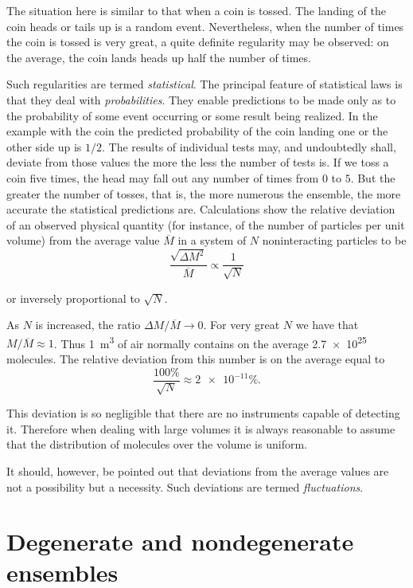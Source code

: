 The situation here is similar to that when a coin is tossed. The landing of the coin heads or tails up is a random event. Nevertheless, when the number of times the coin is tossed is very great, a quite definite regularity may be observed: on the average, the coin lands heads up half the number of times.

Such regularities are termed \textit{statistical}. The principal feature of statistical laws is that they deal with \textit{probabilities}. They enable predictions to be made only as to the probability of some event occurring or some result being realized. In the example with the coin the predicted probability of the coin landing one or the other side up is $1/2$. The results of individual tests may, and undoubtedly shall, deviate from those values the more the less the number of tests is. If we toss a coin five times, the head may fall out any number of times from $0$ to $5$. But the greater the number of tosses, that is, the more numerous the ensemble, the more accurate the statistical predictions are. Calculations show the relative deviation of an observed physical quantity (for instance, of the number of particles per unit volume) from the average value $\overline{M}$ in a system of $N$ noninteracting particles to be
\begin{equation*}
    \frac{\sqrt{\Delta{M}^2}}{\overline{M}} \propto \frac{1}{\sqrt{N}}
\end{equation*}

\noindent
or inversely proportional to $\sqrt{N}$.

As $N$ is increased, the ratio $\Delta{M}/\overline{M}\to 0$. For very great $N$ we have that $M/\overline{M}\approx 1$. Thus \SI{1}{\metre\cubed} of air normally contains on the average \num{2.7e25} molecules. The relative deviation from this number is on the average equal to
\begin{equation*}
    \frac{100\%}{\sqrt{N}} \approx \num{2e-11}\%.
\end{equation*}

\noindent
This deviation is so negligible that there are no instruments capable of detecting it. Therefore when dealing with large volumes it is always reasonable to assume that the distribution of molecules over the volume is uniform.

It should, however, be pointed out that deviations from the average values are not a possibility but a necessity. Such deviations are termed \textit{fluctuations}.

\section{Degenerate and nondegenerate ensembles}\label{sec:24}

